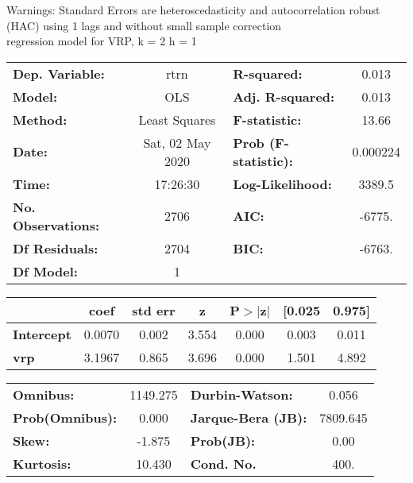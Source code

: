 Warnings: \newline
 [1] Standard Errors are heteroscedasticity and autocorrelation robust (HAC) using 1 lags and without small sample correction\\ 

regression model for VRP, k = 2 h = 1\begin{center}
\begin{tabular}{lclc}
\toprule
\textbf{Dep. Variable:}    &       rtrn       & \textbf{  R-squared:         } &     0.013   \\
\textbf{Model:}            &       OLS        & \textbf{  Adj. R-squared:    } &     0.013   \\
\textbf{Method:}           &  Least Squares   & \textbf{  F-statistic:       } &     13.66   \\
\textbf{Date:}             & Sat, 02 May 2020 & \textbf{  Prob (F-statistic):} &  0.000224   \\
\textbf{Time:}             &     17:26:30     & \textbf{  Log-Likelihood:    } &    3389.5   \\
\textbf{No. Observations:} &        2706      & \textbf{  AIC:               } &    -6775.   \\
\textbf{Df Residuals:}     &        2704      & \textbf{  BIC:               } &    -6763.   \\
\textbf{Df Model:}         &           1      & \textbf{                     } &             \\
\bottomrule
\end{tabular}
\begin{tabular}{lcccccc}
                   & \textbf{coef} & \textbf{std err} & \textbf{z} & \textbf{P$> |$z$|$} & \textbf{[0.025} & \textbf{0.975]}  \\
\midrule
\textbf{Intercept} &       0.0070  &        0.002     &     3.554  &         0.000        &        0.003    &        0.011     \\
\textbf{vrp}       &       3.1967  &        0.865     &     3.696  &         0.000        &        1.501    &        4.892     \\
\bottomrule
\end{tabular}
\begin{tabular}{lclc}
\textbf{Omnibus:}       & 1149.275 & \textbf{  Durbin-Watson:     } &    0.056  \\
\textbf{Prob(Omnibus):} &   0.000  & \textbf{  Jarque-Bera (JB):  } & 7809.645  \\
\textbf{Skew:}          &  -1.875  & \textbf{  Prob(JB):          } &     0.00  \\
\textbf{Kurtosis:}      &  10.430  & \textbf{  Cond. No.          } &     400.  \\
\bottomrule
\end{tabular}
\end{center}

